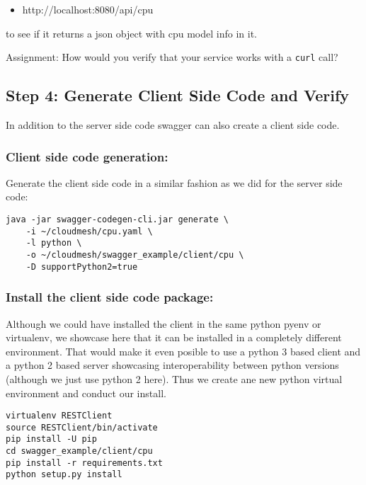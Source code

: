 \begin{itemize}
\tightlist
\item
  http://localhost:8080/api/cpu
\end{itemize}

to see if it returns a json object with cpu model info in it.

Assignment: How would you verify that your service works with a
\texttt{curl} call?

\hypertarget{step-4-generate-client-side-code-and-verify}{%
\subsection{Step 4: Generate Client Side Code and
Verify}\label{step-4-generate-client-side-code-and-verify}}

In addition to the server side code swagger can also create a client
side code.

\hypertarget{client-side-code-generation}{%
\subsubsection{Client side code
generation:}\label{client-side-code-generation}}

Generate the client side code in a similar fashion as we did for the
server side code:

\begin{verbatim}
java -jar swagger-codegen-cli.jar generate \
    -i ~/cloudmesh/cpu.yaml \
    -l python \
    -o ~/cloudmesh/swagger_example/client/cpu \
    -D supportPython2=true
\end{verbatim}

\hypertarget{install-the-client-side-code-package}{%
\subsubsection{Install the client side code
package:}\label{install-the-client-side-code-package}}

Although we could have installed the client in the same python pyenv or
virtualenv, we showcase here that it can be installed in a completely
different environment. That would make it even posible to use a python 3
based client and a python 2 based server showcasing interoperability
between python versions (although we just use python 2 here). Thus we
create ane new python virtual environment and conduct our install.

\begin{verbatim}
virtualenv RESTClient
source RESTClient/bin/activate
pip install -U pip
cd swagger_example/client/cpu
pip install -r requirements.txt
python setup.py install
\end{verbatim}

